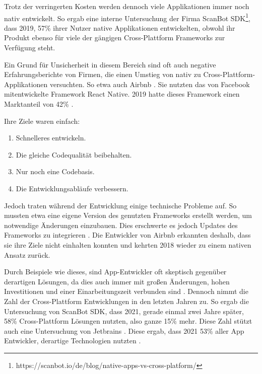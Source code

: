 Trotz der verringerten Kosten werden dennoch viele Applikationen immer noch nativ entwickelt. So ergab eine interne Untersuchung der Firma ScanBot SDK\footnote{https://scanbot.io/de/blog/native-apps-vs-cross-platform/}, dass 2019, 57\% ihrer Nutzer native Applikationen entwickelten, obwohl ihr Produkt ebenso für viele der gängigen Cross-Plattform Frameworks zur Verfügung steht.

Ein Grund für Unsicherheit in diesem Bereich sind oft auch negative Erfahrungsberichte von Firmen, die einen Umstieg von nativ zu Cross-Plattform-Applikationen versuchten.  So etwa auch Airbnb \cite{Airbnb_react_goals}. Sie nutzten das von Facebook mitentwickelte Framework React Native. 2019 hatte dieses Framework einen Marktanteil von 42\% \cite{statist_CP_Framework}. 

Ihre Ziele waren einfach:
\begin{enumerate}%
    \item Schnelleres entwickeln.
    \item Die gleiche Codequalität beibehalten.
    \item Nur noch eine Codebasis.
    \item Die Entwicklungsabläufe verbessern.
\end{enumerate}
Jedoch traten während der Entwicklung einige technische Probleme auf. So mussten etwa eine eigene Version des genutzten Frameworks erstellt werden, um notwendige Änderungen einzubauen. Dies erschwerte es jedoch Updates des Frameworks zu integrieren \cite{Airbnb_technology}. Die Entwickler von Airbnb erkannten deshalb, dass sie ihre Ziele nicht einhalten konnten und kehrten 2018 wieder zu einem nativen Ansatz zurück.

Durch Beispiele wie dieses, sind App-Entwickler oft skeptisch gegenüber derartigen Lösungen, da dies auch immer mit großen Änderungen, hohen Investitionen und einer  Einarbeitungszeit verbunden sind \cite{medium_Lehtimäki}. Dennoch nimmt die Zahl der Cross-Plattform Entwicklungen in den letzten Jahren zu. So ergab die Untersuchung von ScanBot SDK, dass 2021, gerade einmal zwei Jahre später, 58\% Cross-Plattform Lösungen nutzten, also ganze 15\% mehr. Diese Zahl stützt auch eine Untersuchung von Jetbrains \cite{JetBrains_miscellaneous_2021}. Diese ergab, dass 2021 53\% aller App Entwickler, derartige Technologien nutzten .

